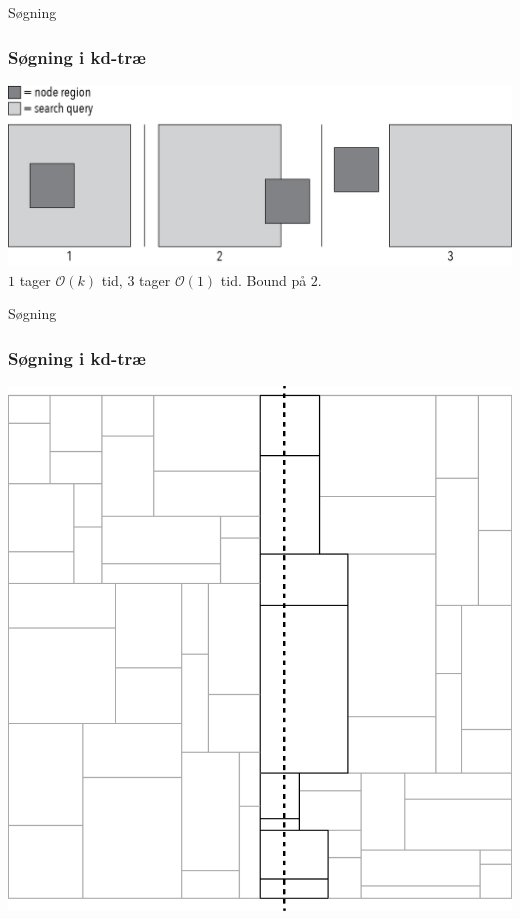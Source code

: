 \documentclass[pdf]{beamer}
\begin{document}
\begin{frame}{Søgning}
  \frametitle{Søgning i kd-træ}
  \begin{center}
    \includegraphics[scale=0.75]{pictures/search_query_overlap.png} \\

    $1$ tager $\mathcal{O}(k)$ tid, $3$ tager $\mathcal{O}(1)$ tid. Bound på $2$.\\


  \end{center}

\end{frame}


\begin{frame}{Søgning}
  \frametitle{Søgning i kd-træ}
  \begin{center}
    \includegraphics[scale=0.75]{pictures/kd_bound2.png}
  \end{center}
\end{frame}
\end{document}
